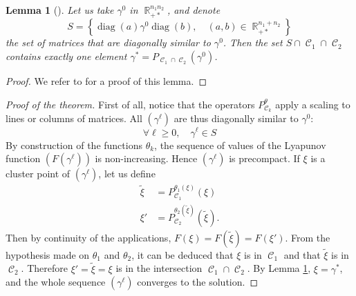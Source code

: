 \documentclass{article} %
\DeclareMathOperator{\IR}{\mathbb{R}}
\DeclareMathOperator{\Ccal}{\mathcal{C}}
\DeclareMathOperator{\diag}{diag}
\theoremstyle{plain}
\newtheorem{lemma}{Lemma}
\theoremstyle{definition}
\theoremstyle{remark}
\begin{document}
\begin{lemma}[]
	\label{lemma:trivial_intersection}
	Let us take $\gamma^0$ in $\IR_{+*}^{n_1 n_2}$,
	and denote
	\[
	S = \left\{
	\diag(a) \gamma^0 \diag(b),\quad
	(a,b) \in \IR_{+*}^{n_1 + n_2}
	\right\}
	\]
	the set of matrices that are diagonally similar to $\gamma^0$.
	Then the set $S \cap \Ccal_1 \cap \Ccal_2$ contains exactly one element $\gamma^* = P_{\Ccal_1 \cap \Ccal_2}(\gamma^0)$.
\end{lemma}
\begin{proof}
	We refer to \cite{cuturi13} for a proof of this lemma.
\end{proof}


\begin{proof}[Proof of the theorem]
	First of all, notice that the operators $P_{\Ccal_k}^\theta$ apply a scaling to lines or columns of matrices. All $(\gamma^{\ell})$ are thus diagonally similar to $\gamma^0$:
	\[
	\forall \ell\ge0,\quad \gamma^{\ell} \in S
	\]
	By construction of the functions $\theta_k$, the sequence of values of the Lyapunov function $(F(\gamma^{\ell}))$ is non-increasing. Hence $(\gamma^{\ell})$ is precompact.
	If $\xi$ is a cluster point of $(\gamma^{\ell})$, let us define
	\begin{align*}
	\tilde{\xi} &= P_{\Ccal_1}^{\theta_1(\xi)}(\xi) \\
	\xi' &= P_{\Ccal_2}^{\theta_2(\tilde{\xi})}(\tilde{\xi}).
	\end{align*}
	Then by continuity of the applications, $F(\xi) = F(\tilde{\xi}) = F(\xi')$.
	From the hypothesis made on $\theta_1$ and $\theta_2$, it can be deduced that $\xi$ is in $\Ccal_1$ and that $\tilde{\xi}$ is in $\Ccal_2$. Therefore $\xi' = \tilde{\xi} = \xi$ is in the intersection $\Ccal_1 \cap \Ccal_2$.
	By Lemma \ref{lemma:trivial_intersection}, $\xi = \gamma^*$, and the whole sequence $(\gamma^{\ell})$ converges to the solution.
\end{proof}



\end{document}
